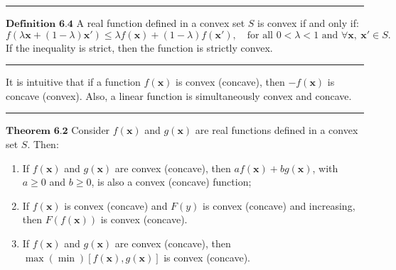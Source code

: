\documentclass[0pt, a4paper]{article}
\begin{document}
\noindent\rule{\textwidth}{1pt}

$\textbf{Definition 6.4}$ A real function defined in a convex set $S$ is convex if and only if:
$$f(\lambda\textbf{x}+(1-\lambda)\textbf{x}')\leq\lambda f(\textbf{x})+(1-\lambda)f(\textbf{x}'),\quad\text{for all }0<\lambda<1\text{ and }\forall\textbf{x},\ \textbf{x}'\in S.$$
If the inequality is strict, then the function is strictly convex.

\noindent\rule{\textwidth}{1pt}

It is intuitive that if a function $f(\textbf{x})$ is convex (concave), then $-f(\textbf{x})$ is concave (convex). Also, a linear function is simultaneously convex and concave.

\noindent\rule{\textwidth}{1pt}

$\textbf{Theorem 6.2}$ Consider $f(\textbf{x})$ and $g(\textbf{x})$ are real functions defined in a convex set $S$. Then:
\begin{enumerate}
	\item If $f(\textbf{x})$ and $g(\textbf{x})$ are convex (concave), then $af(\textbf{x})+bg(\textbf{x})$, with $a\geq0$ and $b\geq0$, is also a convex (concave) function;
	\item If $f(\textbf{x})$ is convex (concave) and $F(y)$ is convex (concave) and increasing, then $F(f(\textbf{x}))$ is convex (concave).
	\item If $f(\textbf{x})$ and $g(\textbf{x})$ are convex (concave), then $\max(\min)\left[ f(\textbf{x}),g(\textbf{x})\right]$ is convex (concave).
\end{enumerate}
\end{document}
